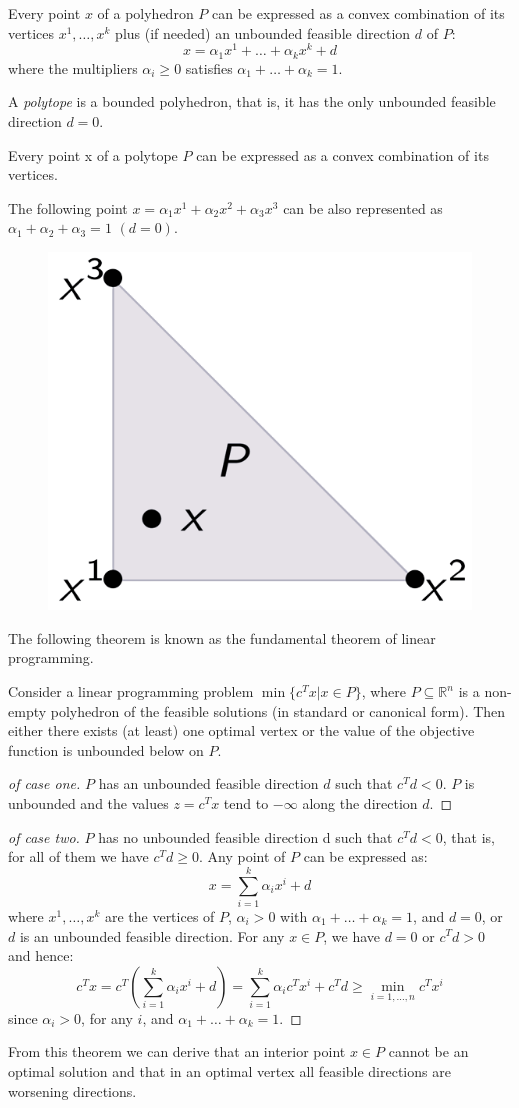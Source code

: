 \documentclass[12pt, a4paper]{report}
\begin{document}
    \begin{theorem}
        Every point $x$ of a polyhedron $P$ can be expressed as a convex combination of its vertices $x^1,\dots,x^k$ plus (if needed) an unbounded feasible direction $d$ 
        of $P$: 
        \[x=\alpha_1x^1+\dots+\alpha_kx^k+d\]
        where the multipliers $\alpha_i \geq 0$ satisfies $\alpha_1+\dots+\alpha_k=1$. 
    \end{theorem}
    \begin{definition}
        A \emph{polytope} is a bounded polyhedron, that is, it has the only unbounded feasible direction $d=0$. 
    \end{definition}
    Every point x of a polytope $P$ can be expressed as a convex combination of its vertices. 
    \begin{example}
        The following point $x=\alpha_1x^1+\alpha_2x^2+\alpha_3x^3$ can be also represented as $\alpha_1+\alpha_2+\alpha_3=1$ $(d=0)$. 
        \begin{figure}[H]
            \centering
            \includegraphics[width=0.2\linewidth]{images/polytope.png}
        \end{figure}
    \end{example}
    The following theorem is known as the fundamental theorem of linear programming. 
    \begin{theorem}
        Consider a linear programming problem $\min\{c^Tx|x \in P\}$, where $P \subseteq \mathbb{R}^n$ 
        is a non-empty polyhedron of the feasible solutions (in standard or canonical form). Then either there exists (at least) one optimal 
        vertex or the value of the objective function is unbounded below on $P$. 
    \end{theorem}
    \begin{proof}[of case one]
        $P$ has an unbounded feasible direction $d$ such that $c^Td < 0$. $P$ is unbounded and the values 
        $z=c^Tx$ tend to $-\infty$ along the direction $d$. 
    \end{proof}
    \begin{proof}[of case two]
        $P$ has no unbounded feasible direction d such that $c^Td < 0$, that is, for all of them we have $c^Td \geq 0$.
        Any point of $P$ can be expressed as: 
        \[x=\sum_{i=1}^k{\alpha_ix^i + d}\]
        where $x^1,\dots,x^k$ are the vertices of $P$, $\alpha_i > 0$ with $\alpha_1+\dots+\alpha_k=1$, and $d = 0$, or $d$ is an unbounded feasible direction. For 
        any $x \in P$, we have $d = 0$ or $c^Td > 0$ and hence: 
        \[c^Tx=c^T\left(\sum_{i=1}^{k}{\alpha_ix^i+d}\right)=\sum_{i=1}^{k}{\alpha_ic^Tx^i+c^Td}\geq\min_{i=1,\dots,n}{c^Tx^i}\]
        since $\alpha_i > 0$, for any $i$, and $\alpha_1+\dots+\alpha_k=1$. 
    \end{proof}
    From this theorem we can derive that an interior point $x \in P$ cannot be an optimal solution and that in an optimal vertex all feasible directions are worsening directions.
    
\end{document}
